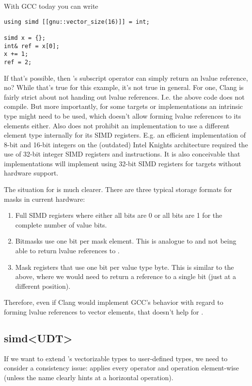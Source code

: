 With GCC today you can write
\medskip\begin{lstlisting}[style=Vc]
using simd [[gnu::vector_size(16)]] = int;

simd x = {};
int& ref = x[0];
x += 1;
ref = 2;
\end{lstlisting}
If that's possible, then 's subscript operator can simply
return an lvalue reference, no?
While that's true for this example, it's not true in general.
For one, Clang is fairly strict about not handing out lvalue references.
I.e. the above code does not compile.
But more importantly, for some targets or implementations an intrinsic type
might need to be used, which doesn't allow forming lvalue references to its
elements either.
Also \simd does not prohibit an implementation to use a different element type
internally for its SIMD registers.
E.g. an efficient implementation of 8-bit and 16-bit integers on the (outdated)
Intel Knights architecture required the use of 32-bit integer SIMD registers
and instructions.
It is also conceivable that implementations will implement
 using 32-bit  SIMD registers for
targets without hardware support.

The situation for \mask is much clearer.
There are three typical storage formats for masks in current hardware:
\begin{enumerate}
  \item Full SIMD registers where either all bits are 0 or all bits are 1 for
    the complete number of value bits.
  \item Bitmasks use one bit per mask element.
    This is analogue to  and  not being able to
    return lvalue references to .
  \item Mask registers that use one bit per value type byte.
    This is similar to the above, where we would need to return a reference to
    a single bit (just at a different position).
\end{enumerate}
Therefore, even if Clang would implement GCC's behavior with regard to forming
lvalue references to vector elements, that doesn't help for \mask.

\subsection{simd<UDT>}\label{sec:simd<array>}
If we want to extend \simd's vectorizable types to user-defined types, we need
to consider a consistency issue:
 applies every operator and operation element-wise (unless the
name clearly hints at a horizontal operation).

